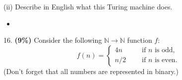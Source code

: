 \documentclass[11pt]{article}
\begin{document}
\noindent
%
(ii) Describe in English what this Turing machine does.
 \begin{itemize}
    \item[] {
  }
\end{itemize}






\bigskip
\noindent
%
16. {\bf (9\%)} Consider the following $\mathbb N \to \mathbb N$ function $f$:
%
\[
f(n)=\left\{
 \begin{array}{ll}
 4n\qquad &\mbox{if $n$ is odd},\\
 n/2 &\mbox{if $n$ is even}.
 \end{array}
\right.
\]
%
(Don't forget that all numbers are represented in binary.)
%
\end{document}
